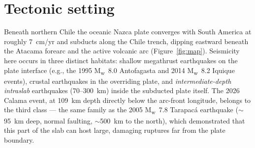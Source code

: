 \documentclass[11pt]{article}
\newcommand{\Mw}{M\textsubscript{w}}
\begin{document}
\section{Tectonic setting}
Beneath northern Chile the oceanic Nazca plate converges with South America at roughly
7~cm/yr and subducts along the Chile trench, dipping eastward beneath the Atacama forearc
and the active volcanic arc (Figure~\ref{fig:map}). Seismicity here occurs in three distinct
habitats: shallow megathrust earthquakes on the plate interface (e.g., the 1995 \Mw~8.0
Antofagasta and 2014 \Mw~8.2 Iquique events), crustal earthquakes in the overriding plate, and
\emph{intermediate-depth intraslab} earthquakes (70--300~km) inside the subducted plate itself.
The 2026 Calama event, at 109~km depth directly below the arc-front longitude, belongs to the
third class --- the same family as the 2005 \Mw~7.8 Tarapac\'a earthquake ($\sim$95~km deep,
normal faulting, $\sim$500~km to the north), which demonstrated that this part of the slab can
host large, damaging ruptures far from the plate boundary.
\end{document}
